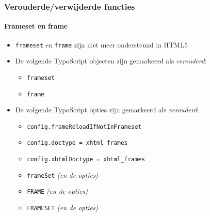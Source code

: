 \begin{frame}[fragile]
	\frametitle{Verouderde/verwijderde functies}
	\framesubtitle{Frameset en frame}

	\begin{itemize}
		\item \texttt{frameset} en \texttt{frame} zijn niet meer ondersteund in HTML5
		\item De volgende TypoScript objecten zijn gemarkeerd als \textit{verouderd}:

			\begin{itemize}
				\item \texttt{frameset}
				\item \texttt{frame}
			\end{itemize}

		\item De volgende TypoScript opties zijn gemarkeerd als \textit{verouderd}:

			\begin{itemize}
				\item \texttt{config.frameReloadIfNotInFrameset}
				\item \texttt{config.doctype = xhtml\_frames}
				\item \texttt{config.xhtmlDoctype = xhtml\_frames}
				\item \texttt{frameSet} \tabto{1.8cm}\textit{(en de opties)}
				\item \texttt{FRAME} \tabto{1.8cm}\textit{(en de opties)}
				\item \texttt{FRAMESET} \tabto{1.8cm}\textit{(en de opties)}
			\end{itemize}

	\end{itemize}

\end{frame}

